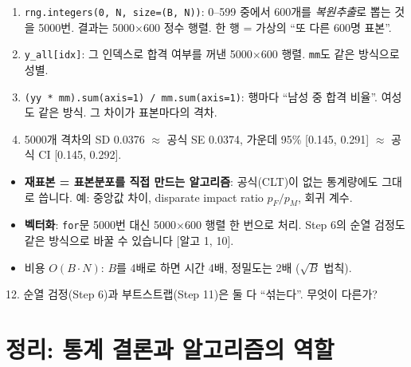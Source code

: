 \documentclass[11pt,a4paper]{article}
\newcommand{\code}[1]{\texttt{#1}}
\newcommand{\Ac}[1]{{\scriptsize\textsf{\color{green!45!black}[알고 #1]}}}
\begin{document}
\begin{howbox}
\begin{enumerate}
\item \code{rng.integers(0, N, size=(B, N))}: 0–599 중에서 600개를 \emph{복원추출}로 뽑는 것을 5000번. 결과는 5000$\times$600 정수 행렬. 한 행 = 가상의 ``또 다른 600명 표본''.
\item \code{y\_all[idx]}: 그 인덱스로 합격 여부를 꺼낸 5000$\times$600 행렬. \code{mm}도 같은 방식으로 성별.
\item \code{(yy * mm).sum(axis=1) / mm.sum(axis=1)}: 행마다 ``남성 중 합격 비율''. 여성도 같은 방식. 그 차이가 표본마다의 격차.
\item 5000개 격차의 SD 0.0376 $\approx$ 공식 SE 0.0374, 가운데 95\% [0.145, 0.291] $\approx$ 공식 CI [0.145, 0.292].
\end{enumerate}
\end{howbox}

\begin{algobox}
\begin{itemize}
\item \textbf{재표본 = 표본분포를 직접 만드는 알고리즘}: 공식(CLT)이 없는 통계량에도 그대로 씁니다. 예: 중앙값 차이, disparate impact ratio $p_F/p_M$, 회귀 계수.
\item \textbf{벡터화}: \code{for}문 5000번 대신 5000$\times$600 행렬 한 번으로 처리. Step 6의 순열 검정도 같은 방식으로 바꿀 수 있습니다 \Ac{1, 10}.
\item 비용 $O(B\cdot N)$: $B$를 4배로 하면 시간 4배, 정밀도는 2배 ($\sqrt B$ 법칙).
\end{itemize}
\end{algobox}

\begin{qbox}
12. 순열 검정(Step 6)과 부트스트랩(Step 11)은 둘 다 ``섞는다''. 무엇이 다른가?
\end{qbox}

\section{정리: 통계 결론과 알고리즘의 역할}
\end{document}
